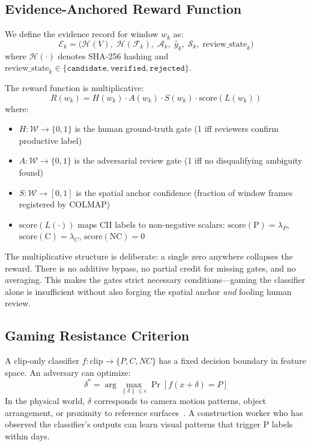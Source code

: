 \documentclass[sigconf,nonacm]{acmart}
\begin{document}
\subsection{Evidence-Anchored Reward Function}

We define the evidence record for window $w_k$ as:
\begin{equation}
\mathcal{E}_k = \bigl(\mathcal{H}(V),\; \mathcal{H}(\mathcal{F}_k),\; \mathcal{A}_k,\; \hat{y}_k,\; \mathcal{S}_k,\; \text{review\_state}_k\bigr)
\end{equation}
where $\mathcal{H}(\cdot)$ denotes SHA-256 hashing and $\text{review\_state}_k \in \{\texttt{candidate}, \texttt{verified}, \texttt{rejected}\}$.

The reward function is multiplicative:
\begin{equation}
\label{eq:reward}
R(w_k) = H(w_k) \cdot A(w_k) \cdot S(w_k) \cdot \mathrm{score}(L(w_k))
\end{equation}
where:
\begin{itemize}[leftmargin=1.4em,itemsep=0.1em]
\item $H : \mathcal{W} \to \{0,1\}$ is the human ground-truth gate (1 iff reviewers confirm productive label)
\item $A : \mathcal{W} \to \{0,1\}$ is the adversarial review gate (1 iff no disqualifying ambiguity found)
\item $S : \mathcal{W} \to [0,1]$ is the spatial anchor confidence (fraction of window frames registered by COLMAP)
\item $\mathrm{score}(L(\cdot))$ maps CII labels to non-negative scalars: $\mathrm{score}(\text{P}) = \lambda_P$, $\mathrm{score}(\text{C}) = \lambda_C$, $\mathrm{score}(\text{NC}) = 0$
\end{itemize}

The multiplicative structure is deliberate: a single zero anywhere collapses the reward.
There is no additive bypass, no partial credit for missing gates, and no averaging.
This makes the gates strict necessary conditions---gaming the classifier alone is insufficient without also forging the spatial anchor \emph{and} fooling human review.

\subsection{Gaming Resistance Criterion}

A clip-only classifier $f: \text{clip} \to \{P, C, NC\}$ has a fixed decision boundary in feature space.
An adversary can optimize:
\begin{equation}
\delta^* = \arg\max_{\|\delta\| \leq \epsilon} \Pr[f(x + \delta) = P]
\end{equation}
In the physical world, $\delta$ corresponds to camera motion patterns, object arrangement, or proximity to reference surfaces~\cite{adversarial}.
A construction worker who has observed the classifier's outputs can learn visual patterns that trigger P labels within days.
\end{document}
